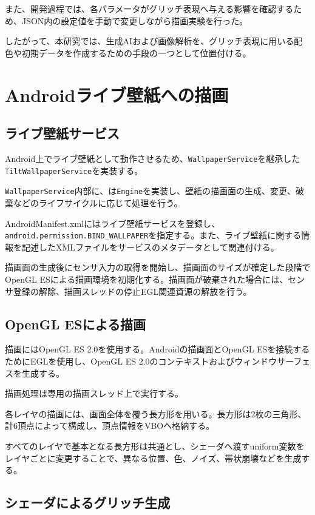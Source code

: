 また、開発過程では、各パラメータがグリッチ表現へ与える影響を確認するため、JSON内の設定値を手動で変更しながら描画実験を行った。

したがって、本研究では、生成AIおよび画像解析を、グリッチ表現に用いる配色や初期データを作成するための手段の一つとして位置付ける。


\section{Androidライブ壁紙への描画}

\subsection{ライブ壁紙サービス}

Android上でライブ壁紙として動作させるため、\texttt{WallpaperService}を継承した\texttt{TiltWallpaperService}を実装する。

\texttt{WallpaperService}内部に、は\texttt{Engine}を実装し、壁紙の描画面の生成、変更、破棄などのライフサイクルに応じて処理を行う。

AndroidManifest.xmlにはライブ壁紙サービスを登録し、\texttt{android.\allowbreak permission.\allowbreak BIND\_\allowbreak WALLPAPER}を指定する。また、ライブ壁紙に関する情報を記述したXMLファイルをサービスのメタデータとして関連付ける。

描画面の生成後にセンサ入力の取得を開始し、描画面のサイズが確定した段階でOpenGL ESによる描画環境を初期化する。描画面が破棄された場合には、センサ登録の解除、描画スレッドの停止EGL関連資源の解放を行う。


\subsection{OpenGL ESによる描画}

描画にはOpenGL ES 2.0を使用する。Androidの描画面とOpenGL ESを接続するためにEGLを使用し、OpenGL ES 2.0のコンテキストおよびウィンドウサーフェスを生成する。

描画処理は専用の描画スレッド上で実行する。

各レイヤの描画には、画面全体を覆う長方形を用いる。長方形は2枚の三角形、計6頂点によって構成し、頂点情報をVBOへ格納する。

すべてのレイヤで基本となる長方形は共通とし、シェーダへ渡すuniform変数をレイヤごとに変更することで、異なる位置、色、ノイズ、帯状崩壊などを生成する。


\subsection{シェーダによるグリッチ生成}

